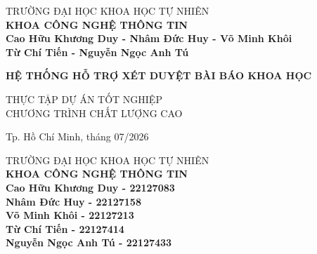 \begin{titlepage}

\begin{center}
TRƯỜNG ĐẠI HỌC KHOA HỌC TỰ NHIÊN\\
\textbf{KHOA CÔNG NGHỆ THÔNG TIN}\\[2cm]


{ \Large \bfseries Cao Hữu Khương Duy - Nhâm Đức Huy - Võ Minh Khôi\\
Từ Chí Tiến - Nguyễn Ngọc Anh Tú\\[1.5cm] } 


{ \Large \bfseries HỆ THỐNG HỖ TRỢ XÉT DUYỆT BÀI BÁO KHOA HỌC\\[2.5cm]} 


\large THỰC TẬP DỰ ÁN TỐT NGHIỆP\\
\large CHƯƠNG TRÌNH CHẤT LƯỢNG CAO\\



\vfill
Tp. Hồ Chí Minh, tháng 07/2026

\end{center}

\pagebreak



\begin{center}

TRƯỜNG ĐẠI HỌC KHOA HỌC TỰ NHIÊN\\
\textbf{KHOA CÔNG NGHỆ THÔNG TIN}\\[2cm]


{\large \bfseries Cao Hữu Khương Duy - 22127083\\} 
{\large \bfseries Nhâm Đức Huy - 22127158\\} 
{\large \bfseries Võ Minh Khôi - 22127213\\} 
{\large \bfseries Từ Chí Tiến - 22127414\\} 
{\large \bfseries Nguyễn Ngọc Anh Tú - 22127433\\[1.5cm]}


\end{center}
\end{titlepage}
